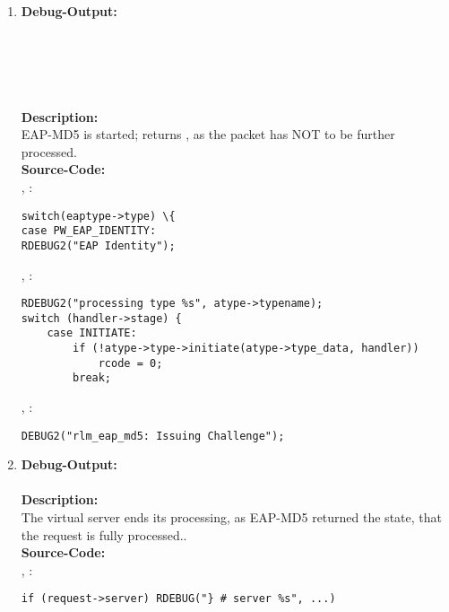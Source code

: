 \begin{enumerate}
\newpage

\item \textbf{Debug-Output:}\\
\\
\\
\\
\\
\\
\newline
\textbf{Description:}\\
EAP-MD5 is started; returns , as the packet has NOT to be further processed.\\
\newline
\textbf{Source-Code:}\\
, :
\begin{lstlisting}
switch(eaptype->type) \{
case PW_EAP_IDENTITY:
RDEBUG2("EAP Identity");
\end{lstlisting}
, :
\begin{lstlisting}
RDEBUG2("processing type %s", atype->typename);
switch (handler->stage) {
	case INITIATE:
		if (!atype->type->initiate(atype->type_data, handler))
			rcode = 0;
		break;
\end{lstlisting}
, :
\begin{lstlisting}
DEBUG2("rlm_eap_md5: Issuing Challenge");
\end{lstlisting}

\item \textbf{Debug-Output:}\\
\\
\newline
\textbf{Description:}\\
The virtual server ends its processing, as EAP-MD5 returned the state, that the request is fully processed..\\
\newline
\textbf{Source-Code:}\\
, :
\begin{lstlisting}
if (request->server) RDEBUG("} # server %s", ...)
\end{lstlisting}
\end{enumerate}

